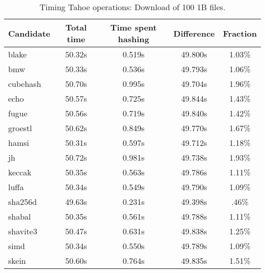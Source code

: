 \begin{table}[h]
  \centering
  \begin{tabular}{ | l | c | c | c | c | }
    \hline
    Candidate & Total time & Time spent hashing & Difference & Fraction \\ \hline
    blake & 50.32s & 0.519s & 49.800s & 1.03\% \\ \hline
    bmw & 50.33s & 0.536s & 49.793s & 1.06\% \\ \hline
    cubehash & 50.70s & 0.995s & 49.704s & 1.96\% \\ \hline
    echo & 50.57s & 0.725s & 49.844s & 1.43\% \\ \hline
    fugue & 50.56s & 0.719s & 49.840s & 1.42\% \\ \hline
    groestl & 50.62s & 0.849s & 49.770s & 1.67\% \\ \hline
    hamsi & 50.31s & 0.597s & 49.712s & 1.18\% \\ \hline
    jh & 50.72s & 0.981s & 49.738s & 1.93\% \\ \hline
    keccak & 50.35s & 0.563s & 49.786s & 1.11\% \\ \hline
    luffa & 50.34s & 0.549s & 49.790s & 1.09\% \\ \hline
    sha256d & 49.63s & 0.231s & 49.398s & .46\% \\ \hline
    shabal & 50.35s & 0.561s & 49.788s & 1.11\% \\ \hline
    shavite3 & 50.47s & 0.631s & 49.838s & 1.25\% \\ \hline
    simd & 50.34s & 0.550s & 49.789s & 1.09\% \\ \hline
    skein & 50.60s & 0.764s & 49.835s & 1.51\% \\ \hline
  \end{tabular}
  \caption{Timing Tahoe operations: Download of 100 1B files.}
  \label{tbl:hashingtimes:get1b}
\end{table}
